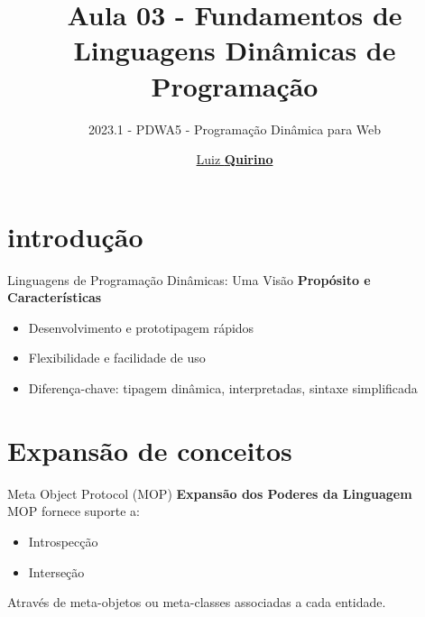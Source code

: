 \documentclass{beamer}
\title{Aula 03 - Fundamentos de Linguagens Dinâmicas de Programação}
\subtitle{2023.1 - PDWA5 - Programação Dinâmica para Web}
\author{\href{mailto:luiz.quirino@ifsp.edu.br}{Luiz \textbf{Quirino}}}
\newcommand{\hrefcol}[2]{\textcolor{cyan}{\href{#1}{#2}}}
\begin{document}
\maketitle

%
%


\section{introdução}
\begin{frame}{Linguagens de Programação Dinâmicas: Uma Visão}
	\textbf{Propósito e Características}
	\begin{itemize}
		\item Desenvolvimento e prototipagem rápidos
		\item Flexibilidade e facilidade de uso
		\item Diferença-chave: tipagem dinâmica, interpretadas, sintaxe simplificada
	\end{itemize}
\end{frame}




\section{Expansão de conceitos}




\begin{frame}{Meta Object Protocol (MOP)}
	\textbf{Expansão dos Poderes da Linguagem}\\
	MOP fornece suporte a:
	\begin{itemize}
		\item Introspecção
		\item Interseção
	\end{itemize}
	Através de meta-objetos ou meta-classes associadas a cada entidade.
\end{frame}
\end{document}
